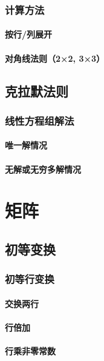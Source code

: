 \documentclass[a4paper,12pt]{article}
\begin{document}
    \subsection{计算方法}
    \subsubsection{按行/列展开}
    \subsubsection{对角线法则（2×2, 3×3）}

    \section{克拉默法则}
    \subsection{线性方程组解法}
    \subsubsection{唯一解情况}
    \subsubsection{无解或无穷多解情况}

    \chapter{矩阵}

    \section{初等变换}
    \subsection{初等行变换}
    \subsubsection{交换两行}
    \subsubsection{行倍加}
    \subsubsection{行乘非零常数}
\end{document}
